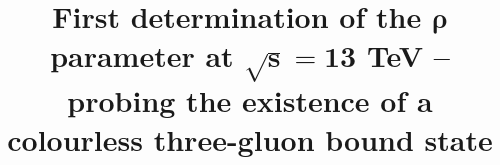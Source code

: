 \documentclass[twocolumn,a4paper,superscriptaddress,preprintnumbers,showpacs,showkeys,nofootinbib]{revtex4-1}
\begin{document}
\title{First determination of the $\mathbf{\rho}$ parameter at $\mathbf{\sqrt s = 13}$ TeV -- probing the existence of a colourless three-gluon bound state}

\noaffiliation



\begin{abstract}

\end{abstract}




\maketitle


















\acknowledgements





\end{document}
